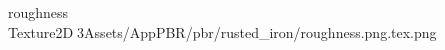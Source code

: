	   roughness             	   Texture2D   3   Assets/AppPBR/pbr/rusted_iron/roughness.png.tex.png